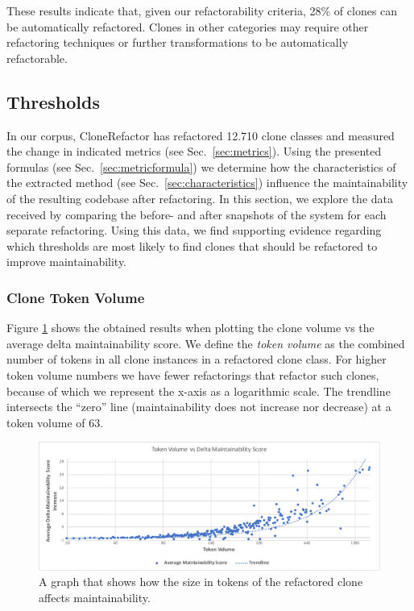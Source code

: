 \documentclass[]{IEEEtran}
\begin{document}
These results indicate that, given our refactorability criteria, 28\% of clones can be automatically refactored. Clones in other categories may require other refactoring techniques or further transformations to be automatically refactorable.

\subsection{Thresholds}
In our corpus, CloneRefactor has refactored 12.710 clone classes and measured the change in indicated metrics (see Sec.~\ref{sec:metrics}). Using the presented formulas (see Sec.~\ref{sec:metricformula}) we determine how the characteristics of the extracted method (see Sec.~\ref{sec:characteristics}) influence the maintainability of the resulting codebase after refactoring. In this section, we explore the data received by comparing the before- and after snapshots of the system for each separate refactoring. Using this data, we find supporting evidence regarding which thresholds are most likely to find clones that should be refactored to improve maintainability.

\subsubsection{Clone Token Volume}
Figure \ref{fig:maintainabilityscore} shows the obtained results when plotting the clone volume vs the average delta maintainability score. We define the \textit{token volume} as the combined number of tokens in all clone instances in a refactored clone class. For higher token volume numbers we have fewer refactorings that refactor such clones, because of which we represent the x-axis as a logarithmic scale. The trendline intersects the ``zero'' line (maintainability does not increase nor decrease) at a token volume of 63.

\begin{figure}
  \includegraphics[width=1\textwidth]{img/tokenvolume}
  \caption{A graph that shows how the size in tokens of the refactored clone affects maintainability.}
  \label{fig:maintainabilityscore}
\end{figure}
\end{document}
